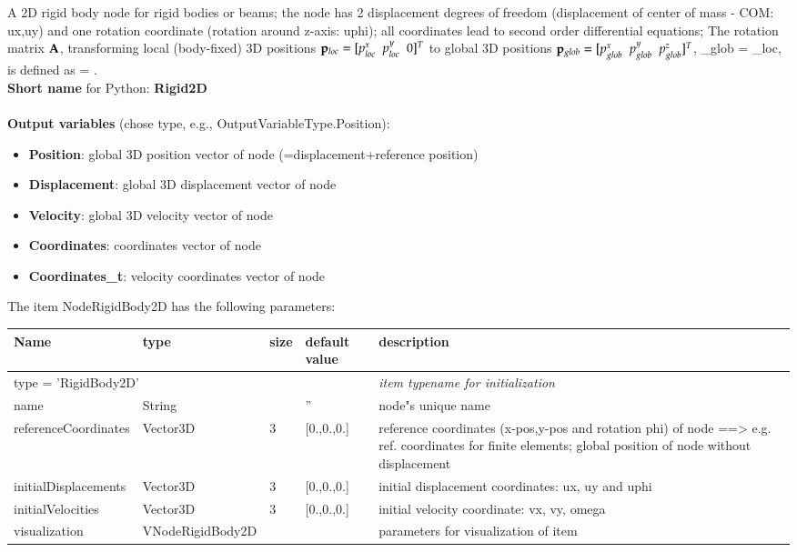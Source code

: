 A 2D rigid body node for rigid bodies or beams; the node has 2 displacement degrees of freedom (displacement of center of mass - COM: ux,uy) and one rotation coordinate (rotation around z-axis: uphi); all coordinates lead to second order differential equations; The rotation matrix $\mathbf{A}$, transforming local (body-fixed) 3D positions $\mathbf{p}_{loc} = [p^x_{loc}\;\;p^y_{loc}\;\;0]^T$ to global 3D positions $\mathbf{p}_{glob} = [p^x_{glob}\;\;p^y_{glob}\;\;p^z_{glob}]^T$, \be \pv_{glob} = \Am \pv_{loc}, \ee is defined as \be \Am = \mp{\cos(\varphi)}{-\sin(\varphi)}{\sin(\varphi)}{\cos(\varphi)}.\ee
 \\
{\bf Short name} for Python: {\bf Rigid2D}
 \\\\ 
{\bf Output variables} (chose type, e.g., OutputVariableType.Position): 
\begin{itemize}
    \item {\bf Position}: global 3D position vector of node (=displacement+reference position)
    \item {\bf Displacement}: global 3D displacement vector of node
    \item {\bf Velocity}: global 3D velocity vector of node
    \item {\bf Coordinates}: coordinates vector of node
    \item {\bf Coordinates\_t}: velocity coordinates vector of node
\end{itemize}
The item NodeRigidBody2D has the following parameters:
\begin{center}
  \footnotesize
  \begin{longtable}{| p{4.5cm} | p{2.5cm} | p{0.5cm} | p{2.5cm} | p{6cm} |}
    \hline
    \bf Name & \bf type & \bf size & \bf default value & \bf description \\ \hline
    \multicolumn{4}{l}{\parbox{10cm}{type = 'RigidBody2D'}} & \multicolumn{1}{l}{\parbox{6cm}{\it item typename for initialization}}\\ \hline
    name &     String &      &     '' &     node"s unique name\\ \hline
    referenceCoordinates &     Vector3D &     3 &     [0.,0.,0.] &     reference coordinates (x-pos,y-pos and rotation phi) of node ==> e.g. ref. coordinates for finite elements; global position of node without displacement\\ \hline
    initialDisplacements &     Vector3D &     3 &     [0.,0.,0.] &     initial displacement coordinates: ux, uy and uphi\\ \hline
    initialVelocities &     Vector3D &     3 &     [0.,0.,0.] &     initial velocity coordinate: vx, vy, omega\\ \hline
    visualization & VNodeRigidBody2D & & & parameters for visualization of item \\ \hline
	  \end{longtable}
	\end{center}
